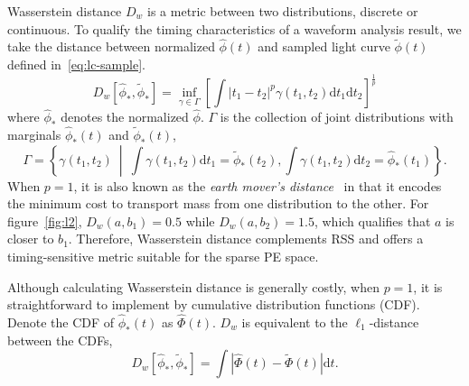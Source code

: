 Wasserstein distance $D_w$ is a metric between two distributions, discrete or continuous. To qualify the timing characteristics of a waveform analysis result, we take the distance between normalized $\hat{\phi}(t)$ and sampled light curve $\tilde{\phi}(t)$ defined in~\eqref{eq:lc-sample}.
\begin{equation}
  D_w\left[\hat{\phi}_*, \tilde{\phi}_*\right] = \inf_{\gamma \in \Gamma} \left[\int \left\vert t_1 - t_2 \right\vert^p \gamma(t_1, t_2)\mathrm{d}t_1\mathrm{d}t_2\right]^{\frac{1}{p}}
\end{equation}
where $\hat{\phi}_*$ denotes the normalized $\hat{\phi}$. $\Gamma$ is the collection of joint distributions with marginals $\hat{\phi}_*(t)$ and $\tilde{\phi}_*(t)$,
\begin{equation*}
  \label{eq:joint}
  \Gamma = \left\{\gamma(t_1, t_2) ~\middle\vert~ \int\gamma(t_1,t_2)\mathrm{d}t_1 = \tilde{\phi}_*(t_2) , \int\gamma(t_1,t_2)\mathrm{d}t_2 = \hat{\phi}_*(t_1) \right\}.
\end{equation*}
When $p=1$, it is also known as the \textit{earth mover's distance}~\cite{levina_earth_2001} in that it encodes the minimum cost to transport mass from one distribution to the other.
For figure~\ref{fig:l2}, $D_w(a, b_1) = 0.5$ while $D_w(a, b_2) = 1.5$, which qualifies that $a$ is closer to $b_1$. Therefore, Wasserstein distance complements RSS and offers a timing-sensitive metric suitable for the sparse PE space.

Although calculating Wasserstein distance is generally costly, when $p=1$, it is straightforward to implement by cumulative distribution functions (CDF). Denote the CDF of $\hat{\phi}_*(t)$ as $\hat\Phi(t)$. $D_w$ is equivalent to the $\ell_1$-distance between the CDFs,
\begin{equation}
    D_w\left[\hat{\phi}_*, \tilde{\phi}_*\right] = \int\left|\hat{\Phi}(t) - \tilde{\Phi}(t)\right| \mathrm{d}t.
    \label{eq:numerical}
\end{equation}
